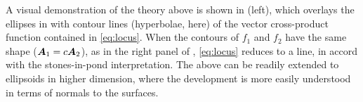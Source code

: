 A visual demonstration of the theory above is
shown in  (left), which overlays the ellipses in  with contour lines
(hyperbolae, here)
of
the vector cross-product function contained in \eqref{eq:locus}.
When the contours of $f_1$ and $f_2$ have the same shape ($\bm{A}_1 = c \bm{A}_2 $), as in the right panel of ,
\eqref{eq:locus}
reduces to a line, in accord with the stones-in-pond interpretation.
The above can be readily extended to ellipsoids in higher dimension, where the development is more easily understood
in terms of normals to the surfaces.

